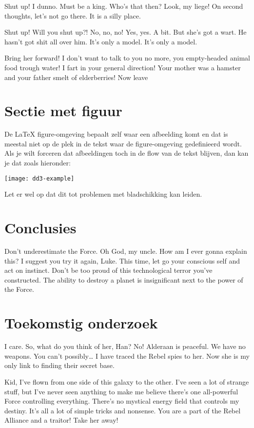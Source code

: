 \documentclass[english,a0,portrait]{hogent-poster}
\begin{document}
\begin{multicols}{2}
Shut up! I dunno. Must be a king. Who's that then? Look, my liege! On second thoughts, let's not go there. It is a silly place.

Shut up! Will you shut up?! No, no, no! Yes, yes. A bit. But she's got a wart. He hasn't got shit all over him. It's only a model. It's only a model.

Bring her forward! I don't want to talk to you no more, you empty-headed animal food trough water! I fart in your general direction! Your mother was a hamster and your father smelt of elderberries! Now leave 

\section{Sectie met figuur}

De {\LaTeX} figure-omgeving bepaalt zelf waar een afbeelding komt en dat is meestal niet op de plek in de tekst waar de figure-omgeving gedefinieerd wordt. Als je wilt forceren dat afbeeldingen toch in de flow van de tekst blijven, dan kan je dat zoals hieronder:

\begin{center}
  \captionsetup{type=figure}
  \texttt{[image: dd3-example]}
\end{center}

Let er wel op dat dit tot problemen met bladschikking kan leiden.

\section{Conclusies}

Don't underestimate the Force. Oh God, my uncle. How am I ever gonna explain this? I suggest you try it again, Luke. This time, let go your conscious self and act on instinct. Don't be too proud of this technological terror you've constructed. The ability to destroy a planet is insignificant next to the power of the Force.

\section{Toekomstig onderzoek}

I care. So, what do you think of her, Han? No! Alderaan is peaceful. We have no weapons. You can't possibly… I have traced the Rebel spies to her. Now she is my only link to finding their secret base.

Kid, I've flown from one side of this galaxy to the other. I've seen a lot of strange stuff, but I've never seen anything to make me believe there's one all-powerful Force controlling everything. There's no mystical energy field that controls my destiny. It's all a lot of simple tricks and nonsense. You are a part of the Rebel Alliance and a traitor! Take her away! 

\end{multicols}
\end{document}
